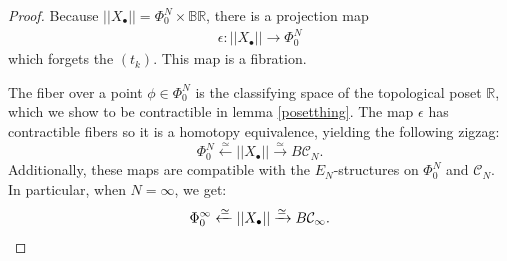 \documentclass[12pt]{amsart}
\theoremstyle{plain}
\theoremstyle{definition}
\theoremstyle{remark}
\DeclareMathOperator{\Conf}{Conf}
\DeclareMathOperator{\UConf}{UConf}
\newcommand{\C}{\mathcal{C}}
\begin{document}
\begin{proof}
Because $\vert\vert X_\bullet\vert\vert = \Phi_0^N\times \mathbb{B}\mathbb{R}$, there is a projection map 
\begin{align}
\epsilon: \vert\vert X_\bullet\vert\vert\rightarrow \Phi_0^N 
\end{align}
which forgets the $(t_k)$.
This map is a fibration.

The fiber over a point $\phi\in\Phi_0^N$ is the classifying space of the topological poset $\mathbb{R}$, which we show to be contractible in lemma \ref{posetthing}.
The map $\epsilon$ has contractible fibers so it is a homotopy equivalence, yielding the following zigzag:
\[\Phi_0^N\xleftarrow{\simeq}\vert\vert X_\bullet\vert\vert \xrightarrow{\simeq} B\C_N.\]
Additionally, these maps are compatible with the $E_N$-structures on $\Phi_0^N$ and $\C_N$.
In particular, when $N=\infty$, we get:
\[\Phi_0^\infty\xleftarrow{\simeq}\vert\vert X_\bullet\vert\vert \xrightarrow{\simeq} B\C_\infty. \qedhere\]



\end{proof}
\end{document}

